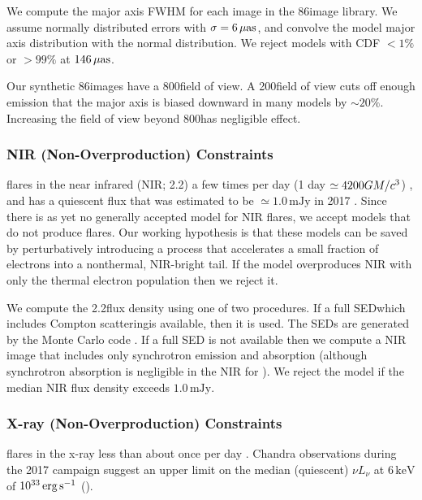 We compute the major axis FWHM for each image in the 86\GHz image library.  We assume normally distributed errors with $\sigma = 6\,\mathrm{\mu as}$, and convolve the model major axis distribution with the normal distribution.  We reject models with CDF $< 1\%$ or $> 99\%$ at $146\,\mathrm{\mu as}$.

Our synthetic 86\GHz images have a 800\uas field of view.  A 200\uas field of view cuts off enough emission that the major axis is biased downward in many models by $\sim 20\%$.  Increasing the field of view beyond 800\uas has negligible effect.

\subsubsection{NIR (Non-Overproduction) Constraints}\label{subsec:nir}

\sgra flares in the near infrared (NIR; 2.2\um) a few times per day (1 day $\simeq 4200 GM/c^3$) \citep{2018ApJ...863...15W}, and has a quiescent flux that was estimated to be $\simeq 1.0\,\mathrm{mJy}$ in 2017 \citep{2020A&A...638A...2G}.  Since there is as yet no generally accepted model for NIR flares, we accept models that do not produce flares.  Our working hypothesis is that these models can be saved by perturbatively introducing a process that accelerates a small fraction of electrons into a nonthermal, NIR-bright tail.  If the model overproduces NIR with only the thermal electron population then we reject it.

We compute the 2.2\um flux density using one of two procedures.  If a full SED\textemdash which includes Compton scattering\textemdash is available, then it is used. The SEDs are generated by the \grmonty Monte Carlo code \citep{2009ApJS..184..387D, Wong_2022, Davelaar_2022}. If a full SED is not available then we compute a NIR image that includes only synchrotron emission and absorption (although synchrotron absorption is negligible in the NIR for \sgra).  We reject the model if the median NIR flux density exceeds $1.0\,\mathrm{mJy}$.

\subsubsection{X-ray (Non-Overproduction) Constraints}

\sgra flares in the x-ray less than about once per day \citep[see, e.g.,][and references therein]{2018MNRAS.473..306Y}.  Chandra observations during the 2017 campaign suggest an upper limit on the median (quiescent) $\nu L_\nu$ at $6\,\mathrm{keV}$ of $10^{33}\,\mathrm{erg\,s^{-1}}$ ().

